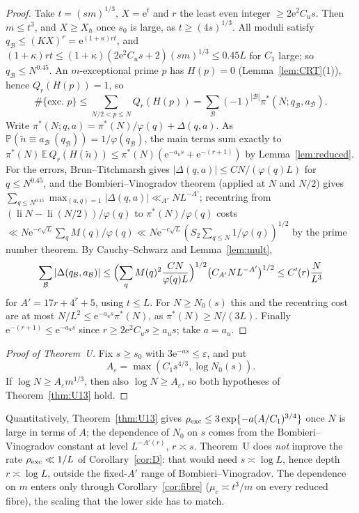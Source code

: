 \documentclass[10pt,reqno]{amsart}
\theoremstyle{definition}
\newcommand{\E}{\mathbb E}
\newcommand{\Prob}{\mathbb P}
\newcommand{\li}{\operatorname{li}}
\newcommand{\e}{\mathrm e}
\begin{document}
\begin{proof}
Take $t=(sm)^{1/3}$, $X=\e^t$ and $r$ the least even integer
$\geq2\e^2C_us$.  Then $m\leq t^3$, and $X\geq X_h$ once $s_0$ is
large, as $t\geq(4s)^{1/3}$.  All moduli satisfy
$q_{\mathcal B}\leq(KX)^r=\e^{(1+\kappa)rt}$, and
$(1+\kappa)rt\leq(1+\kappa)(2\e^2C_us+2)(sm)^{1/3}\leq0.45L$ for $C_1$
large; so $q_{\mathcal B}\leq N^{0.45}$.  An $m$-exceptional prime $p$
has $H(p)=0$ (Lemma~\ref{lem:CRT}(1)), hence $Q_r(H(p))=1$, so
\[
 \#\{\text{exc.\ }p\}\leq\sum_{N/2<p\leq N}Q_r(H(p))
 =\sum_{\mathcal B}(-1)^{|\mathcal B|}\pi^*(N;q_{\mathcal B},a_{\mathcal B}).
\]
Write $\pi^*(N;q,a)=\pi^*(N)/\varphi(q)+\Delta(q,a)$.  As
$\Prob(\tilde n\equiv a_{\mathcal B}\ (q_{\mathcal B}))=1/\varphi(q_{\mathcal B})$,
the main terms sum exactly to $\pi^*(N)\,\E\,Q_r(H(\tilde n))\leq
\pi^*(N)(\e^{-a_us}+\e^{-(r+1)})$ by Lemma~\ref{lem:reduced}.  For the
errors, Brun--Titchmarsh gives $|\Delta(q,a)|\leq CN/(\varphi(q)L)$ for
$q\leq N^{0.45}$, and the Bombieri--Vinogradov theorem (applied at $N$
and $N/2$) gives $\sum_{q\leq N^{0.45}}\max_{(a,q)=1}|\Delta(q,a)|
\ll_{A'}NL^{-A'}$; recentring from $(\li N-\li(N/2))/\varphi(q)$ to
$\pi^*(N)/\varphi(q)$ costs
$\ll N\e^{-c\sqrt L}\sum_qM(q)/\varphi(q)\ll N\e^{-c\sqrt L}(S_2\sum_{q\leq N}1/\varphi(q))^{1/2}$
by the prime number theorem.  By Cauchy--Schwarz and Lemma~\ref{lem:mult},
\[
 \sum_{\mathcal B}|\Delta(q_{\mathcal B},a_{\mathcal B})|
 \leq\Bigl(\sum_qM(q)^2\frac{CN}{\varphi(q)L}\Bigr)^{1/2}
 \bigl(C_{A'}NL^{-A'}\bigr)^{1/2}\leq C'(r)\frac N{L^3}
\]
for $A'=17r+4^r+5$, using $t\leq L$.  For $N\geq N_0(s)$ this and the
recentring cost are at most $N/L^2\leq\e^{-a_us}\pi^*(N)$, as
$\pi^*(N)\geq N/(3L)$.  Finally $\e^{-(r+1)}\leq\e^{-a_us}$ since
$r\geq2\e^2C_us\geq a_us$; take $a=a_u$.
\end{proof}

\begin{proof}[Proof of Theorem~U]
Fix $s\geq s_0$ with $3\e^{-as}\leq\varepsilon$, and put
\[
 A_\varepsilon=\max(C_1s^{4/3},\log N_0(s)).
\]
If
$\log N\geq A_\varepsilon m^{1/3}$, then also $\log N\geq A_\varepsilon$,
so both hypotheses of Theorem~\ref{thm:U13} hold.
\end{proof}

Quantitatively, Theorem~\ref{thm:U13} gives
$\rho_{\rm exc}\leq3\exp\{-a(A/C_1)^{3/4}\}$ once $N$ is large in terms
of $A$; the dependence of $N_0$ on $s$ comes from the Bombieri--Vinogradov
constant at level $L^{-A'(r)}$, $r\asymp s$.  Theorem~U does \emph{not}
improve the rate $\rho_{\rm exc}\ll1/L$ of Corollary~\ref{cor:D}: that
would need $s\asymp\log L$, hence depth $r\asymp\log L$, outside the
fixed-$A'$ range of Bombieri--Vinogradov.  The dependence on $m$ enters
only through Corollary~\ref{cor:fibre} ($\mu_c\asymp t^3/m$ on every
reduced fibre), the scaling that the lower side has to match.
\end{document}
